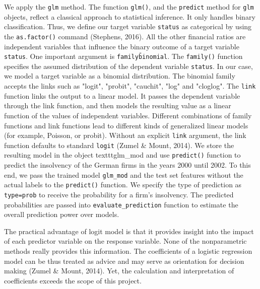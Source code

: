\documentclass{article}
\begin{document}
We apply the \texttt{glm} method. The function \texttt{glm()}, and the \texttt{predict} method for \texttt{glm} objects, reflect a classical approach to statistical inference. It only handles binary classification. Thus, we define our target variable \texttt{status} as categorical by using the \texttt{as.factor()} command (Stephens, 2016). All the other financial ratios are independent variables that influence the binary outcome of a target variable \texttt{status}. One important argument is \texttt{family\=binomial}. The \texttt{family()} function specifies the assumed distribution of the dependent variable \texttt{status}. In our case, we model a target variable as a binomial distribution. The binomial family accepts the links such as "logit", "probit", "cauchit", "log" and "cloglog". The \texttt{link} function links the output to a linear model. It passes the dependent variable through the link function, and then models the resulting value as a linear function of the values of independent variables. Different combinations of family functions and link functions lead to different kinds of generalized linear models (for example, Poisson, or probit). Without an explicit \texttt{link} argument, the link function defaults to standard \texttt{logit} (Zumel \& Mount, 2014). We store the resulting model in the object texttt{glm\_mod} and use \texttt{predict()} function to predict the insolvency of the German firms in the years 2000 until 2002. To this end, we pass the trained model \texttt{glm\_mod} and the test set features without the actual labels to the \texttt{predict()} function. We specify the type of prediction as \texttt{type=prob} to receive the probability for a firm's insolvency. The predicted probabilities are passed into \texttt{evaluate\_prediction} function to estimate the overall prediction power over models.



The practical advantage of logit model is that it provides insight into the impact of each predictor variable on the response variable. None of the nonparametric methods really provides this information. The coefficients of a logistic regression model can be thus treated as advice and may serve as orientation for decision making (Zumel \& Mount, 2014). Yet, the calculation and interpretation of coefficients exceeds the scope of this project. 
\end{document}
